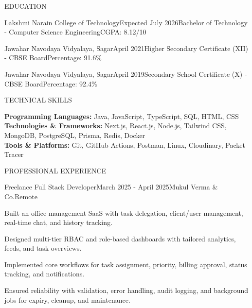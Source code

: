 \documentclass{resume}
\begin{document}
\begin{rSection}{EDUCATION}

\begin{rEducation}{Lakshmi Narain College of Technology}{Expected July 2026}{Bachelor of Technology - Computer Science Engineering}{CGPA: 8.12/10}
\end{rEducation}

\begin{rEducation}{Jawahar Navodaya Vidyalaya, Sagar}{April 2021}{Higher Secondary Certificate (XII) - CBSE Board}{Percentage: 91.6\%}
\end{rEducation}

\begin{rEducation}{Jawahar Navodaya Vidyalaya, Sagar}{April 2019}{Secondary School Certificate (X) - CBSE Board}{Percentage: 92.4\%}
\end{rEducation}

\end{rSection}

\begin{rSection}{TECHNICAL SKILLS}

\textbf{Programming Languages:} Java, JavaScript, TypeScript, SQL, HTML, CSS \\[2pt]
\textbf{Technologies \& Frameworks:} Next.js, React.js, Node.js, Tailwind CSS, MongoDB, PostgreSQL, Prisma, Redis, Docker \\[2pt]
\textbf{Tools \& Platforms:} Git, GitHub Actions, Postman, Linux, Cloudinary, Packet Tracer

\end{rSection}

\begin{rSection}{PROFESSIONAL EXPERIENCE}

\begin{rExperience}{Freelance Full Stack Developer}{March 2025 - April 2025}{Mukul Verma \& Co.}{Remote}
\item Built an office management SaaS with task delegation, client/user management, real-time chat, and history tracking.
\item Designed multi-tier RBAC and role-based dashboards with tailored analytics, feeds, and task overviews.
\item Implemented core workflows for task assignment, priority, billing approval, status tracking, and notifications.
\item Ensured reliability with validation, error handling, audit logging, and background jobs for expiry, cleanup, and maintenance.
\end{rExperience}

\end{rSection}
\end{document}
